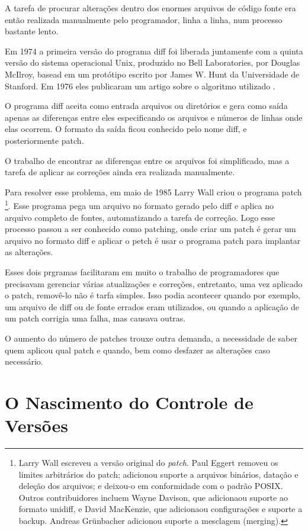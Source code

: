 A tarefa de procurar alterações dentro dos enormes arquivos de código fonte
era então realizada manualmente pelo programador, linha a linha, num processo
bastante lento.

Em 1974 a primeira versão do programa diff foi liberada juntamente com a quinta
versão do sistema operacional Unix, produzido no Bell Laboratories, por Douglas
McIlroy, basead em um protótipo escrito por James W. Hunt da Universidade de
Stanford. Em 1976 eles publicaram um artigo sobre o algoritmo utilizado \cite{Hunt}.

O programa diff aceita como entrada arquivos ou diretórios e gera como saída
apenas as diferenças entre eles especificando os arquivos e números de linhas
onde elas ocorrem. O formato da saída ficou conhecido pelo nome diff, e
posteriormente patch.

O trabalho de encontrar as diferenças entre os arquivos foi simplificado, mas
a tarefa de aplicar as correções ainda era realizada manualmente.

Para resolver esse problema, em maio de 1985 Larry Wall criou o programa patch \cite{Wall}
\footnote{Larry Wall escreveu a versão original do \emph{patch}. Paul Eggert removeu os limites arbitrários do patch; adicionou suporte a arquivos binários, datação e deleção dos arquivos; e deixou-o em conformidade com o padrão POSIX. Outros contribuidores incluem Wayne  Davison, que adicionaou suporte ao formato unidiff, e David MacKenzie, que adicionaou configurações e suporte a backup. Andreas Grünbacher adicionou suporte a mesclagem (merging).\cite{Man}}.
Esse programa pega um arquivo no formato gerado pelo diff e aplica no arquivo
completo de fontes, automatizando a tarefa de correção. Logo esse processo
passou a ser conhecido como patching, onde criar um patch é gerar um arquivo
no formato diff e aplicar o petch é usar o programa patch para implantar as
alterações.

Esses dois prgramas facilitaram em muito o trabalho de programadores que
precisavam gerenciar várias atualizações e correções, entretanto, uma vez
aplicado o patch, removê-lo não é tarfa simples. Isso podia acontecer quando
por exemplo, um arquivo de diff ou de fonte errados eram utilizados, ou
quando a aplicação de um patch corrigia uma falha, mas causava outras.

O aumento do número de patches trouxe outra demanda, a necessidade de
saber quem aplicou qual patch e quando, bem como desfazer as alterações
caso necessário.


\section{O Nascimento do Controle de Versões}

